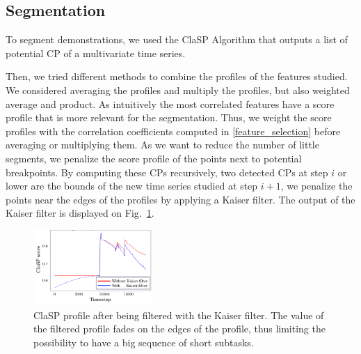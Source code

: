 \documentclass[conference]{IEEEtran}
\begin{document}

\subsection{Segmentation} \label{method_segmentation}

To segment demonstrations, we used the  ClaSP Algorithm that outputs a list  of potential CP of a multivariate time series. 

Then, we tried different methods to combine the profiles of the features studied. We considered averaging the profiles and multiply the profiles, but also weighted average and product. As intuitively the most correlated features have a score profile that is more relevant for the segmentation. Thus, we weight the score profiles with the correlation coefficients computed in \ref{feature_selection} before averaging or multiplying them. As we want to reduce the number of little segments, we penalize the score profile of the points next to potential breakpoints. By computing these CPs recursively, two detected CPs at step $i$ or lower are the bounds of the new time series studied at step $i+1$, we penalize the points near the edges of the profiles by applying a Kaiser filter. The output of the Kaiser filter is displayed on Fig.~\ref{fig:Kaiser}.

\begin{figure}[t]
  \centering
  \includegraphics[width=0.4\textwidth]{img/resolKaiser.pdf}
  \caption{ClaSP profile after being filtered with the Kaiser filter. The value of the filtered profile fades on the edges of the profile, thus limiting the possibility to have a big sequence of short subtasks.}
  \label{fig:Kaiser}
\end{figure}
\end{document}

